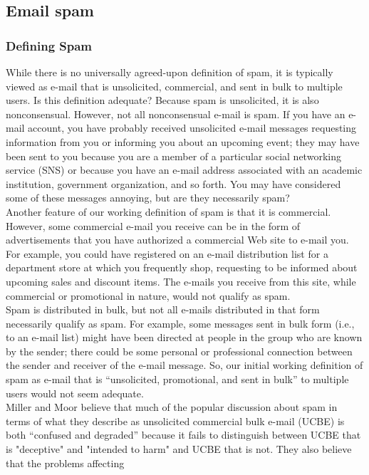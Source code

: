 \documentclass[12pt]{article}
\theoremstyle{definition}
\begin{document}
\subsection{Email spam}
\subsubsection{Defining Spam}
While there is no universally agreed-upon definition of spam, it is typically viewed as
e-mail that is unsolicited, commercial, and sent in bulk to multiple users. Is this definition
adequate? Because spam is unsolicited, it is also nonconsensual. However, not all
nonconsensual e-mail is spam. If you have an e-mail account, you have probably received
unsolicited e-mail messages requesting information from you or informing you about an
upcoming event; they may have been sent to you because you are a member of a particular social networking service (SNS) or because you have an e-mail address
associated with an academic institution, government organization, and so forth. You
may have considered some of these messages annoying, but are they necessarily spam?\\
Another feature of our working definition of spam is that it is commercial. However,
some commercial e-mail you receive can be in the form of advertisements that you have
authorized a commercial Web site to e-mail you. For example, you could have registered
on an e-mail distribution list for a department store at which you frequently shop,
requesting to be informed about upcoming sales and discount items. The e-mails you
receive from this site, while commercial or promotional in nature, would not qualify
as spam.\\
Spam is distributed in bulk, but not all e-mails distributed in that form necessarily
qualify as spam. For example, some messages sent in bulk form (i.e., to an e-mail list)
might have been directed at people in the group who are known by the sender; there
could be some personal or professional connection between the sender and receiver
of the e-mail message. So, our initial working definition of spam as e-mail that is
“unsolicited, promotional, and sent in bulk” to multiple users would not seem
adequate.\\
Miller and Moor believe that much of the popular discussion about spam in terms of
what they describe as unsolicited commercial bulk e-mail (UCBE) is both “confused and
degraded” because it fails to distinguish between UCBE that is "deceptive" and
"intended to harm" and UCBE that is not. They also believe that the problems affecting
\end{document}
